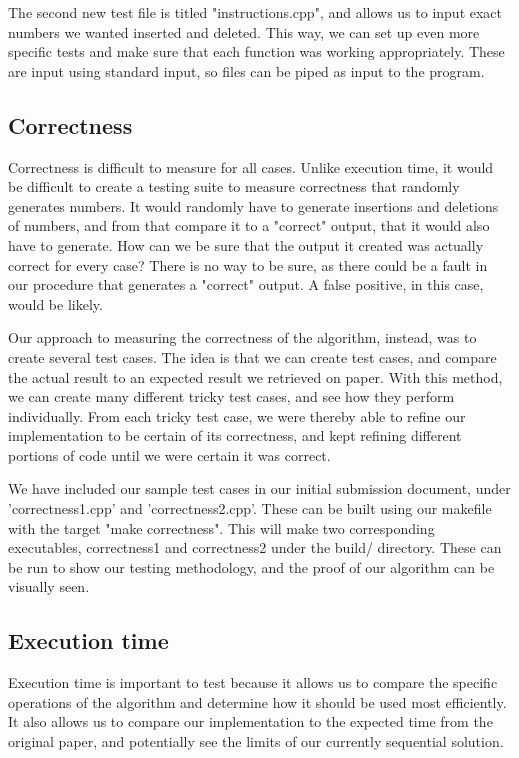\documentclass[journal]{IEEEtran}
\begin{document}
The second new test file is titled "instructions.cpp", and allows us to input exact numbers we wanted inserted and deleted. This way, we can set up even more specific tests and make sure that each function was working appropriately. These are input using standard input, so files can be piped as input to the program.


\subsection{Correctness}

Correctness is difficult to measure for all cases. Unlike execution time, it would be difficult to create a testing suite to measure correctness that randomly generates numbers. It would randomly have to generate insertions and deletions of numbers, and from that compare it to a "correct" output, that it would also have to generate. How can we be sure that the output it created was actually correct for every case? There is no way to be sure, as there could be a fault in our procedure that generates a "correct" output. A false positive, in this case, would be likely.

Our approach to measuring the correctness of the algorithm, instead, was to create several test cases. The idea is that we can create test cases, and compare the actual result to an expected result we retrieved on paper. With this method, we can create many different tricky test cases, and see how they perform individually. From each tricky test case, we were thereby able to refine our implementation to be certain of its correctness, and kept refining different portions of code until we were certain it was correct.

We have included our sample test cases in our initial submission document, under 'correctness1.cpp' and 'correctness2.cpp'. These can be built using our makefile with the target "make correctness". This will make two corresponding executables, correctness1 and correctness2 under the build/ directory. These can be run to show our testing methodology, and the proof of our algorithm can be visually seen.

\subsection{Execution time}

Execution time is important to test because it allows us to compare the specific operations of the algorithm and determine how it should be used most efficiently. It also allows us to compare our implementation to the expected time from the original paper, and potentially see the limits of our currently sequential solution.
\end{document}
